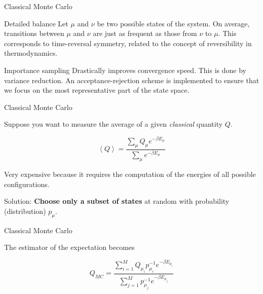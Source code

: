 \documentclass{beamer}
\begin{document}
  \begin{frame}{Classical Monte Carlo}
  
  \begin{block}{Detailed balance}
        Let $\mu$ and $\nu$ be two possible states of the system. On average, transitions between $\mu$ and $\nu$ are just as frequent as those from $\nu$ to $\mu$. This corresponds to time-reversal symmetry, related to the concept of reversibility in thermodynamics.
      \end{block}

      \begin{block}{Importance sampling}
        Drastically improves convergence speed. This is done by variance reduction. An acceptance-rejection scheme is implemented to ensure that we focus on the most representative part of the state space.
      \end{block}

  \end{frame}
  
	\begin{frame}{Classical Monte Carlo}

	Suppose you want to measure the average of a given \emph{classical} quantity $Q$.  
  
	\begin{equation*}
	\left\langle Q \right \rangle = \frac{\sum_\mu Q_\mu e^{-\beta E_\mu}}{\sum_\mu e^{-\beta E_\mu}}
	\end{equation*}
	
	Very expensive because it requires the computation of the energies of all possible configurations.
	
	Solution: \textbf{Choose only a subset of states} at random with probability (distribution) $p_\mu$.

  \end{frame}  
  
  	\begin{frame}{Classical Monte Carlo}

	The estimator of the expectation becomes
	
	\begin{equation*}
	Q_{MC} = \frac{\sum_{i=1}^M Q_{\mu_i} p_{\mu_i}^{-1} e^{-\beta E_{\mu_i}}}{\sum_{j=1}^M p_{\mu_j}^{-1} e^{-\beta E_{\mu_j}}} 
	\end{equation*}

  \end{frame}  
  
\end{document}
